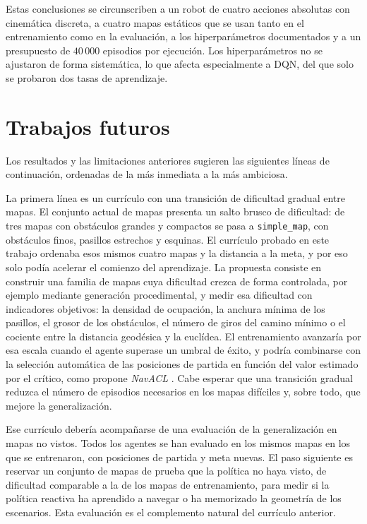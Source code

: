 Estas conclusiones se circunscriben a un robot de cuatro acciones
absolutas con cinemática discreta, a cuatro mapas estáticos que se usan
tanto en el entrenamiento como en la evaluación, a los hiperparámetros
documentados y a un presupuesto de $40\,000$ episodios por ejecución. Los
hiperparámetros no se ajustaron de forma sistemática, lo que afecta
especialmente a DQN, del que solo se probaron dos tasas de aprendizaje.

\section{Trabajos futuros}\label{sec:trabajos_futuros}
Los resultados y las limitaciones anteriores sugieren las siguientes
líneas de continuación, ordenadas de la más inmediata a la más ambiciosa.

La primera línea es un currículo con una transición de dificultad
gradual entre mapas. El conjunto actual de mapas presenta un salto brusco de dificultad: de
tres mapas con obstáculos grandes y compactos se pasa a
\texttt{simple\_map}, con obstáculos finos, pasillos estrechos y
esquinas. El currículo probado en este trabajo ordenaba esos mismos
cuatro mapas y la distancia a la meta, y por eso solo podía acelerar el
comienzo del aprendizaje. La propuesta consiste en construir una familia de
mapas cuya dificultad crezca de forma controlada, por ejemplo mediante
generación procedimental, y medir esa dificultad con indicadores
objetivos: la densidad de ocupación, la anchura mínima de los pasillos,
el grosor de los obstáculos, el número de giros del camino mínimo o el
cociente entre la distancia geodésica y la euclídea. El entrenamiento
avanzaría por esa escala cuando el agente superase un umbral de éxito,
y podría combinarse con la selección automática de las posiciones de
partida en función del valor estimado por el crítico, como propone
\textit{NavACL} \citep{xue2022using}. Cabe esperar que una transición
gradual reduzca el número de episodios necesarios en los mapas
difíciles y, sobre todo, que mejore la generalización.

Ese currículo debería acompañarse de una evaluación de la generalización
en mapas no vistos. Todos los agentes se han evaluado en los mismos mapas en los que se entrenaron, con
posiciones de partida y meta nuevas. El paso siguiente es reservar un
conjunto de mapas de prueba que la política no haya visto, de dificultad
comparable a la de los mapas de entrenamiento, para medir si la política
reactiva ha aprendido a navegar o ha memorizado la geometría de los
escenarios. Esta evaluación es el complemento natural del currículo
anterior.

